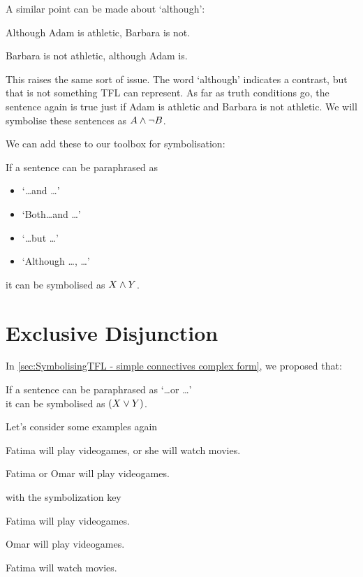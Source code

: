 A similar point can be made about `although':
	\begin{samplesent}
		\item\label{sent:and6}Although Adam is athletic, Barbara is not.
		\item\label{sent:and8} Barbara is not athletic, although Adam is. 
\end{samplesent}
This raises the same sort of issue. The word `although' indicates a contrast, but that is not something TFL can represent. As far as truth conditions go, the sentence again is true just if Adam is athletic and Barbara is not athletic. We will symbolise these sentences as $A\mathbin{\wedge} \neg B$.

We can add these to our toolbox for symbolisation:
	\begin{highlighted}
		If a sentence can be paraphrased as \begin{itemize}
		\item `\ldots and \ldots'
		\item `Both\ldots and \ldots'
		\item `\ldots but \ldots'
		\item `Although \ldots, \ldots'
		\end{itemize} it can be symbolised as $X\mathbin{\wedge}Y$.
	\end{highlighted}

\section{Exclusive Disjunction}
In \cref{sec:SymbolisingTFL - simple connectives complex form}, we proposed that:
\begin{highlighted}
If a sentence can be paraphrased as `\ldots or \ldots' \\it can be symbolised as $(X\vee Y)$.
	\end{highlighted}
Let's consider some examples again
\begin{samplesent}
		\item\label{sent:or1} Fatima will play videogames, or she will watch movies.
		\item\label{sent:or2} Fatima or Omar will play videogames.
	\end{samplesent}
with the symbolization key
\begin{ekey}
		\item[F] Fatima will play videogames.
		\item[O] Omar will play videogames.
		\item[M] Fatima will watch movies.
	\end{ekey}

